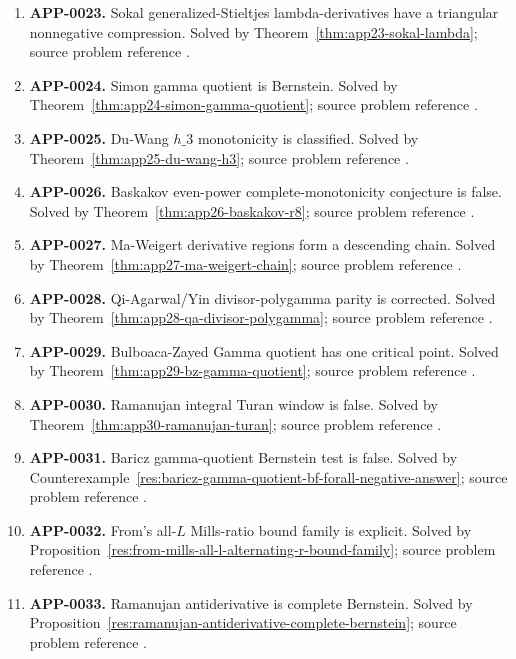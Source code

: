 \documentclass[11pt]{article}
\numberwithin{equation}{section}
\theoremstyle{definition}
\theoremstyle{remark}
\newcommand{\1}{\mathbf 1}
\begin{document}
\begin{enumerate}
\item \label{ledger:app-0023}\textbf{APP-0023.} Sokal generalized-Stieltjes lambda-derivatives have a triangular nonnegative compression. Solved by Theorem~\ref{thm:app23-sokal-lambda}; source problem reference \cite{sokal-gs}.
\item \label{ledger:app-0024}\textbf{APP-0024.} Simon gamma quotient is Bernstein. Solved by Theorem~\ref{thm:app24-simon-gamma-quotient}; source problem reference \cite{simon-moment}.
\item \label{ledger:app-0025}\textbf{APP-0025.} Du-Wang \(h\_3\) monotonicity is classified. Solved by Theorem~\ref{thm:app25-du-wang-h3}; source problem reference \cite{du-wang-h3}.
\item \label{ledger:app-0026}\textbf{APP-0026.} Baskakov even-power complete-monotonicity conjecture is false. Solved by Theorem~\ref{thm:app26-baskakov-r8}; source problem reference \cite{abel-gawronski-neuschel}.
\item \label{ledger:app-0027}\textbf{APP-0027.} Ma-Weigert derivative regions form a descending chain. Solved by Theorem~\ref{thm:app27-ma-weigert-chain}; source problem reference \cite{ma-weigert-log-functions}.
\item \label{ledger:app-0028}\textbf{APP-0028.} Qi-Agarwal/Yin divisor-polygamma parity is corrected. Solved by Theorem~\ref{thm:app28-qa-divisor-polygamma}; source problem reference \cite{qi-agarwal-gamma-ratios}.
\item \label{ledger:app-0029}\textbf{APP-0029.} Bulboaca-Zayed Gamma quotient has one critical point. Solved by Theorem~\ref{thm:app29-bz-gamma-quotient}; source problem reference \cite{bulboaca-zayed-gamma}.
\item \label{ledger:app-0030}\textbf{APP-0030.} Ramanujan integral Turan window is false. Solved by Theorem~\ref{thm:app30-ramanujan-turan}; source problem reference \cite{mishra-swaminathan-ramanujan}.
\item \label{ledger:app-0031}\textbf{APP-0031.} Baricz gamma-quotient Bernstein test is false. Solved by Counterexample~\ref{res:baricz-gamma-quotient-bf-forall-negative-answer}; source problem reference \cite{baricz-turan}.
\item \label{ledger:app-0032}\textbf{APP-0032.} From's all-\(L\) Mills-ratio bound family is explicit. Solved by Proposition~\ref{res:from-mills-all-l-alternating-r-bound-family}; source problem reference \cite{from-mills}.
\item \label{ledger:app-0033}\textbf{APP-0033.} Ramanujan antiderivative is complete Bernstein. Solved by Proposition~\ref{res:ramanujan-antiderivative-complete-bernstein}; source problem reference \cite{mishra-swaminathan-ramanujan}.

\end{enumerate}
\end{document}
